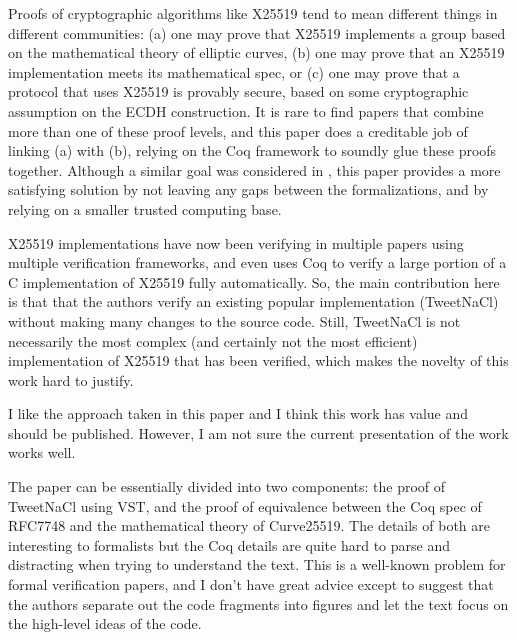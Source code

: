 \begin{center}
\end{center}

Proofs of cryptographic algorithms like X25519 tend to mean different things in
different communities: (a) one may prove that X25519 implements a group based on
the mathematical theory of elliptic curves, (b) one may prove that an X25519
implementation meets its mathematical spec, or (c) one may prove that a protocol
that uses X25519 is provably secure, based on some cryptographic assumption on
the ECDH construction. It is rare to find papers that combine more than one of
these proof levels, and this paper does a creditable job of linking (a) with (b),
relying on the Coq framework to soundly glue these proofs together. Although a
similar goal was considered in \cite{Zinzindohoue2016AVE}, this paper provides
a more satisfying solution by not leaving any gaps between the formalizations,
and by relying on a smaller trusted computing base.


\begin{center}
\end{center}

X25519 implementations have now been verifying in multiple papers using multiple
verification frameworks, and \cite{Erbsen2016SystematicSO} even uses Coq to
verify a large portion of a C implementation of X25519 fully automatically.
So, the main contribution here is that that the authors verify an existing
popular implementation (TweetNaCl) without making many changes to the source
code. Still, TweetNaCl is not necessarily the most complex (and certainly not
the most efficient) implementation of X25519 that has been verified, which
makes the novelty of this work hard to justify.


\begin{center}
\end{center}

I like the approach taken in this paper and I think this work has value and
should be published.
However, I am not sure the current presentation of the work works well.

The paper can be essentially divided into two components: the proof of TweetNaCl
using VST, and the proof of equivalence between the Coq spec of RFC7748 and the
mathematical theory of Curve25519.  The details of both are interesting to
formalists but the Coq details are quite hard to parse and distracting when
trying to understand the text. This is a well-known problem for formal
verification papers, and I don't have great advice except to suggest that the
authors separate out the code fragments into figures and let the text focus
on the high-level ideas of the code.

